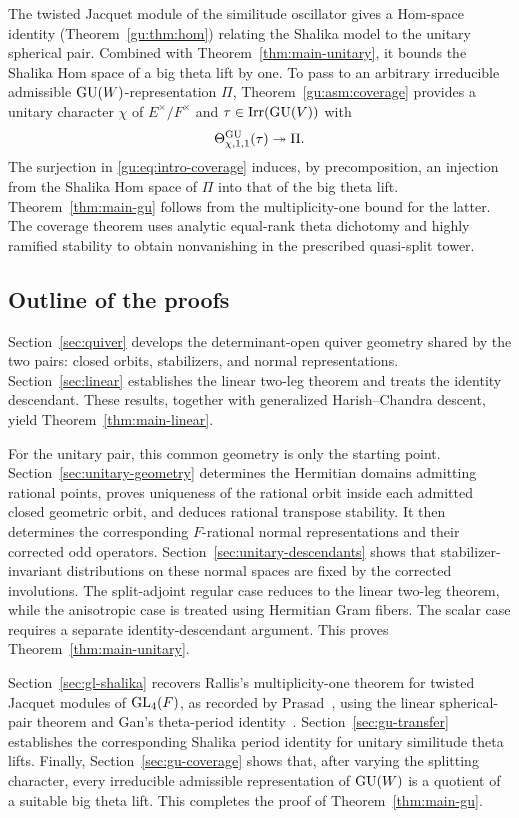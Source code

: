The twisted Jacquet module of the similitude oscillator gives a
Hom-space identity (Theorem~\ref{gu:thm:hom}) relating the
Shalika model to the unitary spherical pair. Combined with
Theorem~\ref{thm:main-unitary}, it bounds the Shalika Hom space of a
big theta lift by one. To pass to an arbitrary irreducible admissible
$\operatorname{GU}(W)$-representation $\Pi$, Theorem~\ref{gu:asm:coverage} provides a
unitary character $\chi$ of $E^\times/F^\times$ and
$\tau\in\operatorname{Irr}(\operatorname{GU}(V))$ with
\begin{equation}\label{gu:eq:intro-coverage}
 \Theta^{\operatorname{GU}}_{\chi,1,1}(\tau)\twoheadrightarrow\Pi.
\end{equation}
The surjection in \eqref{gu:eq:intro-coverage} induces,
by precomposition, an injection from the Shalika Hom space
of $\Pi$ into that of the big theta lift.
Theorem~\ref{thm:main-gu} follows from the
multiplicity-one bound for the latter.
The coverage theorem uses analytic equal-rank theta
dichotomy and highly ramified stability to obtain
nonvanishing in the prescribed quasi-split tower.

\subsection{Outline of the proofs}
Section~\ref{sec:quiver} develops the determinant-open quiver geometry
shared by the two pairs: closed orbits, stabilizers, and normal
representations. Section~\ref{sec:linear} establishes the linear
two-leg theorem and treats the identity descendant.
These results, together with generalized
Harish--Chandra descent, yield Theorem~\ref{thm:main-linear}.

For the unitary pair, this common geometry is only the starting point.
Section~\ref{sec:unitary-geometry} determines the Hermitian domains
admitting rational points, proves uniqueness of the rational orbit
inside each admitted closed geometric orbit, and deduces rational
transpose stability. It then determines the corresponding \(F\)-rational normal representations and their corrected odd operators. Section~\ref{sec:unitary-descendants}
shows that stabilizer-invariant distributions on these
normal spaces are fixed by the corrected
involutions. The split-adjoint regular case
reduces to the linear two-leg theorem, while
the anisotropic case is treated using Hermitian
Gram fibers. The scalar case requires a separate
identity-descendant argument. This proves
Theorem~\ref{thm:main-unitary}.

Section~\ref{sec:gl-shalika} recovers Rallis's multiplicity-one
theorem for twisted Jacquet modules of $\operatorname{GL}_4(F)$, as recorded by
Prasad~\cite[Theorem~1]{PrasadShalika}, using the linear spherical-pair
theorem and Gan's theta-period identity~\cite[Theorem~3.1]{GanPeriods}.
Section~\ref{sec:gu-transfer} establishes the corresponding Shalika
period identity for unitary similitude theta lifts. Finally,
Section~\ref{sec:gu-coverage} shows that, after varying the splitting
character, every irreducible admissible representation of $\operatorname{GU}(W)$ is
a quotient of a suitable big theta lift. This completes the proof of
Theorem~\ref{thm:main-gu}.

